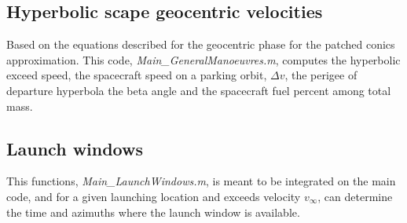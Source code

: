		\subsection{Hyperbolic scape geocentric velocities}
		Based on the equations described for the geocentric phase for the patched conics approximation. This code, \textit{Main\_GeneralManoeuvres.m}, computes the hyperbolic exceed speed, the spacecraft speed on a parking orbit, $\Delta v$, the perigee of departure hyperbola the beta angle and the spacecraft fuel percent among total mass.
		\subsection{Launch windows}
		This functions, \textit{Main\_LaunchWindows.m}, is meant to be integrated on the main code, and for a given launching location and exceeds velocity $v_\infty$, can determine the time and azimuths where the launch window is available.

